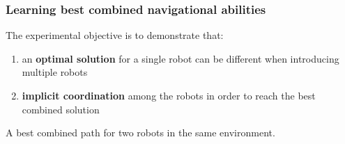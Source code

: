 \begin{frame}
	\frametitle{Learning best combined navigational abilities}
	
	\vspace{0.5cm}
	
	The experimental objective is to demonstrate that:

	\begin{enumerate}
		\item an \textbf{optimal solution} for a single robot can be different when introducing multiple robots
		\item \textbf{implicit coordination} among the robots in order to reach the best combined solution
	\end{enumerate}
	
	\vspace{0.2cm}
	
	A best combined path for two robots in the same environment.
	
	\vspace{-0.1cm}
	
	\begin{center}
	\end{center}
\end{frame}
